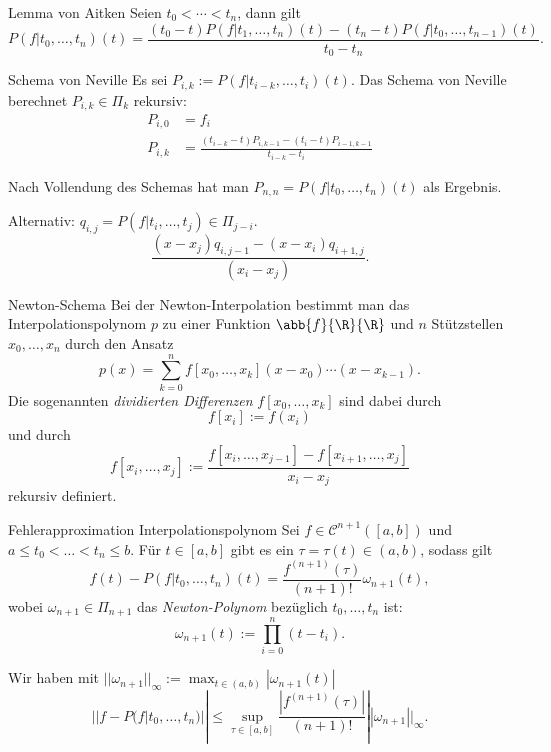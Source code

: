 \begin{karte}{Lemma von Aitken}
	Seien \( t_0 < \cdots < t_n \), dann gilt 
	\[ P(f|t_0,\ldots, t_n)(t) = \frac{ (t_0 - t)P(f|t_1,\ldots,t_n)(t) 
	- (t_n - t) P(f|t_0,\ldots, t_{n-1})(t) }{t_0 - t_n}. \]
\end{karte}

\begin{karte}{Schema von Neville}
	Es sei \( P_{i,k} := P(f|t_{i-k}, \ldots, t_i)(t) \).
	Das Schema von Neville berechnet \( P_{i,k} \in \Pi_k \) rekursiv:
	\begin{align*}
		P_{i,0} &= f_i \\
		P_{i,k} &= \frac{(t_{i-k} - t)P_{i, k-1} - (t_i - t) P_{i-1,k-1}}{t_{i-k} - t_i}
	\end{align*}

	Nach Vollendung des Schemas hat man \( P_{n,n} = P(f|t_0,\ldots,t_n)(t) \)
	als Ergebnis.

	Alternativ: \( q_{i,j} = P(f|t_i,\ldots, t_j) \in \Pi_{j-i} \).
	\[ \frac{ (x- x_j)q_{i,j-1} - (x - x_i) q_{i+1, j} }{(x_i - x_j)}. \]
\end{karte}

\begin{karte}{Newton-Schema}
	Bei der Newton-Interpolation bestimmt man das Interpolationspolynom 
	\( p \) zu einer Funktion \( \abb{f}{\R}{\R} \) und \(n\) Stützstellen
	\( x_0,\ldots, x_n \) durch den Ansatz 
	\[ p(x) = \sum_{k=0}^n f[x_0, \ldots, x_k](x - x_0)\cdots (x - x_{k-1}). \]
	Die sogenannten \textit{dividierten Differenzen} \( f[x_0,\ldots, x_k] \)
	sind dabei durch 
	\[ f[x_i] := f(x_i) \] 
	und durch 
	\[ f[x_i,\ldots, x_j] := \frac{ f[x_i,\ldots, x_{j-1}] - f[x_{i+1}, \ldots, x_j] }{ x_i - x_j } \]
	rekursiv definiert.
\end{karte}

\begin{karte}{Fehlerapproximation Interpolationspolynom}
	Sei \( f \in \mathcal{C}^{n+1}([a,b]) \) und \( a \leq t_0 < \ldots < t_n \leq b \).
	Für \(t\in [a,b]\) gibt es ein \( \tau = \tau(t) \in (a,b) \), sodass gilt 
	\[ f(t) - P(f|t_0,\ldots, t_n)(t) = \frac{f^{(n+1)}(\tau)}{(n+1)!}\omega_{n+1}(t), \]
	wobei \( \omega_{n+1} \in \Pi_{n+1} \) das \textit{Newton-Polynom} bezüglich 
	\( t_0, \ldots, t_n \) ist: 
	\[ \omega_{n+1}(t) := \prod_{i=0}^n (t - t_i). \]

	Wir haben mit \( ||\omega_{n+1}||_\infty := \max_{t\in (a,b)} | \omega_{n+1}(t)| \)
	\[ || f - P(f|t_0,\ldots, t_n) || \leq \sup_{\tau \in [a,b]} \frac{ |f^{(n+1)}(\tau)| }{ (n+1)! } ||\omega_{n+1}||_\infty. \]
\end{karte}

